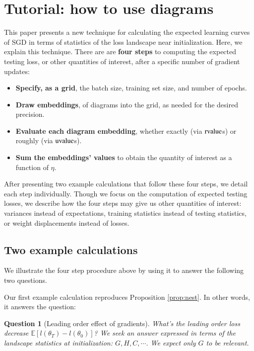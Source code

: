 \documentclass[anon,12pt]{colt2021} %
\newtheorem{quest}{Question}
\newcommand{\uvalue}{\text{\textnormal{uvalue}}}
\newcommand{\rvalue}{\text{\textnormal{rvalue}}}
\newcommand{\expc}{\mathbb{E}}
\begin{document}
\newpage
\section{Tutorial: how to use diagrams}                \label{appendix:tutorial}
    This paper presents a new technique for calculating the expected learning
    curves of SGD in terms of statistics of the loss landscape near
    initialization.  Here, we explain this technique.
    There are are {\bf four steps} to computing the expected testing loss, or
    other quantities of interest, after a specific number of gradient updates: 
    \begin{itemize}
        \item {\bf Specify, as a grid}, the batch size, training set
            size, and number of epochs. 
        \item {\bf Draw embeddings}, of diagrams into the
            grid, as needed for the desired precision.
        \item {\bf Evaluate each diagram embedding}, whether exactly
            (via $\rvalue$s)
            or roughly
            (via $\uvalue$s).
        \item {\bf Sum the embeddings' values} to obtain the quantity of
              interest as a function of $\eta$.
    \end{itemize}
    \noindent
    After presenting two example calculations that follow these four steps, we
    detail each step individually.  Though we focus on the computation of
    expected testing losses, we describe how the four steps may give us other
    quantities of interest: variances instead of expectations, training
    statistics instead of testing statistics, or weight displacements instead
    of losses.  

        \subsection{Two example calculations}\label{appendix:example}
            We illustrate the four step procedure above by using it to 
            answer the following two questions.

                Our first example calculation reproduces Proposition \ref{prop:nest}.
                In other words, it answers the question:
                \begin{quest}[Leading order effect of gradients]\label{qst:grad}
                    What's the leading order loss decrease
                    $\expc[l(\theta_T)-l(\theta_0)]$?
                    We seek an answer expressed in terms of the landscape
                    statistics at initialization: $G,H,C, \cdots$.  We expect
                    only $G$ to be relevant. 
                \end{quest}
\end{document}
